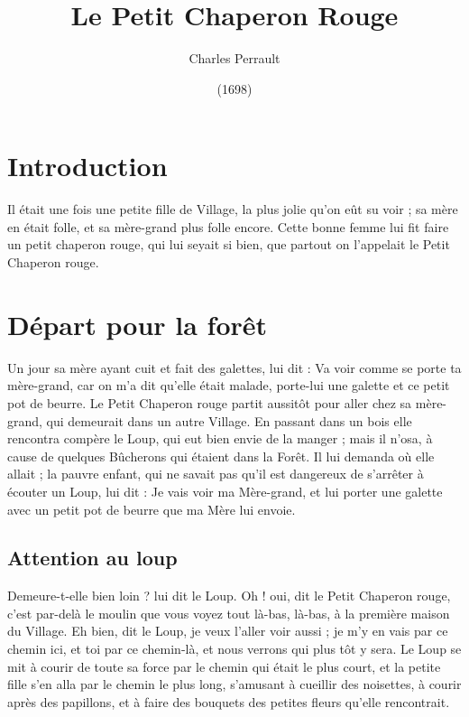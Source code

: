 \documentclass[a4paper,11pt]{article}
\title{Le Petit Chaperon Rouge}
\author{Charles Perrault}
\date{(1698)}
\begin{document}
\maketitle

\section{Introduction}
Il était une fois une petite fille de Village, la plus jolie qu'on eût su voir ; sa mère en était folle, et sa mère-grand plus folle encore. Cette bonne femme lui fit faire un petit chaperon rouge, qui lui seyait si bien, que partout on l'appelait le Petit Chaperon rouge.

\section{Départ pour la forêt}
Un jour sa mère ayant cuit et fait des galettes, lui dit :
Va voir comme se porte ta mère-grand, car on m'a dit qu'elle était malade, porte-lui une galette et ce petit pot de beurre. Le Petit Chaperon rouge partit aussitôt pour aller chez sa mère-grand, qui demeurait dans un autre Village. En passant dans un bois elle rencontra compère le Loup, qui eut bien envie de la manger ; mais il n'osa, à cause de quelques Bûcherons qui étaient dans la Forêt. Il lui demanda où elle allait ; la pauvre enfant, qui ne savait pas qu'il est dangereux de s'arrêter à écouter un Loup, lui dit : Je vais voir ma Mère-grand, et lui porter une galette avec un petit pot de beurre que ma Mère lui envoie.

\subsection{Attention au loup}
Demeure-t-elle bien loin ? lui dit le Loup. Oh ! oui, dit le Petit Chaperon rouge, c'est par-delà le moulin que vous voyez tout là-bas, là-bas, à la première maison du Village. Eh bien, dit le Loup, je veux l'aller voir aussi ; je m'y en vais par ce chemin ici, et toi par ce chemin-là, et nous verrons qui plus tôt y sera. Le Loup se mit à courir de toute sa force par le chemin qui était le plus court, et la petite fille s'en alla par le chemin le plus long, s'amusant à cueillir des noisettes, à courir après des papillons, et à faire des bouquets des petites fleurs qu'elle rencontrait.
\end{document}

